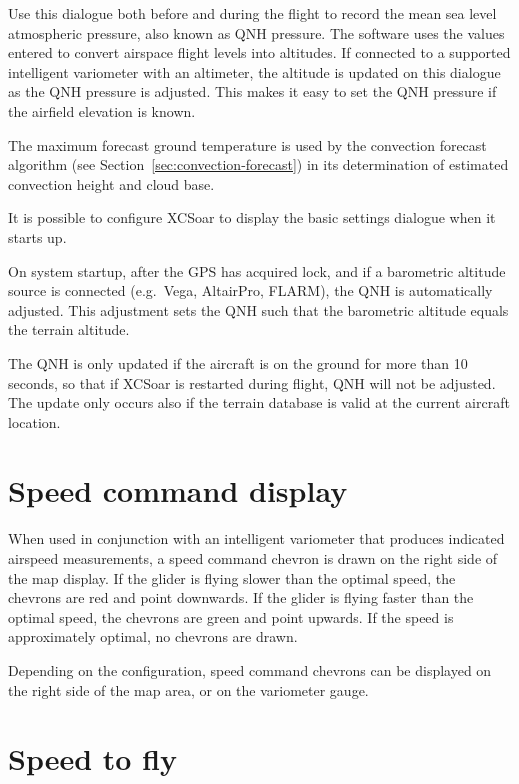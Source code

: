 Use this dialogue both before and during the flight to record the mean
sea level atmospheric pressure, also known as QNH pressure.  The
software uses the values entered to convert airspace flight levels
into altitudes.  If connected to a supported intelligent variometer
with an altimeter, the altitude is updated on this dialogue as the QNH
pressure is adjusted.  This makes it easy to set the QNH pressure if
the airfield elevation is known.

The maximum forecast ground temperature is used by the convection
forecast algorithm (see Section~\ref{sec:convection-forecast}) in its
determination of estimated convection height and cloud base.

\tip It is possible to configure XCSoar to display the basic
settings dialogue when it starts up.

On system startup, after the GPS has acquired lock, and if a
barometric altitude source is connected (e.g.\ Vega, AltairPro,
FLARM), the QNH is automatically adjusted.  This adjustment sets the
QNH such that the barometric altitude equals the terrain altitude.

The QNH is only updated if the aircraft is on the ground for more than
10 seconds, so that if XCSoar is restarted during flight, QNH will not
be adjusted.  The update only occurs also if the terrain database is
valid at the current aircraft location.

\section{Speed command display}

When used in conjunction with an intelligent variometer that produces
indicated airspeed measurements, a speed command chevron is drawn
on the right side of the map display.  If the glider is flying slower
than the optimal speed, the chevrons are red and point downwards.  If
the glider is flying faster than the optimal speed, the chevrons are
green and point upwards.  If the speed is approximately optimal, no
chevrons are drawn.


Depending on the configuration, speed command chevrons can be
displayed on the right side of the map area, or on the variometer
gauge.


\section{Speed to fly}\label{sec:stf}

